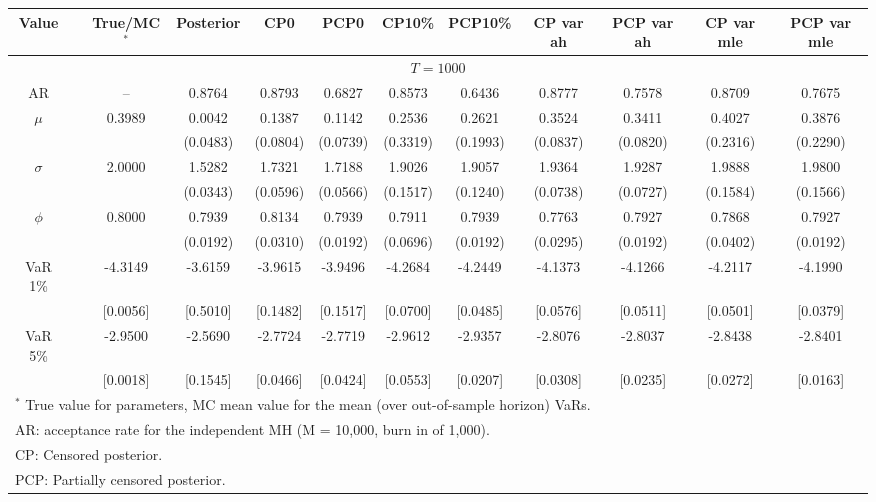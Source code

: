 { \renewcommand{\arraystretch}{1.2} 
\begin{sidewaystable} 
\center 
\begin{tabular}{cc cc cccc cccc} 
Value & & True/MC$^*$ & Posterior & CP0  & PCP0 & CP10\%  & PCP10\% &CP var ah & PCP var ah & CP var mle & PCP var mle \\ \hline 
\hline 
\multicolumn{12}{c}{$T =1000$}  \\ 
\hline 
AR && -- & 0.8764 & 0.8793 & 0.6827 & 0.8573 & 0.6436 &0.8777 & 0.7578 & 0.8709 & 0.7675  \\  
$\mu$&& 0.3989 & 0.0042 & 0.1387 & 0.1142 & 0.2536 & 0.2621 & 0.3524 & 0.3411 & 0.4027 & 0.3876  \\ 
&&   & (0.0483) & (0.0804) & (0.0739) & (0.3319) & (0.1993) &(0.0837) & (0.0820) & (0.2316) & (0.2290)  \\ 
$\sigma$&& 2.0000 & 1.5282 & 1.7321 & 1.7188 & 1.9026 & 1.9057 & 1.9364 & 1.9287 & 1.9888 & 1.9800  \\ 
&&   & (0.0343) & (0.0596) & (0.0566) & (0.1517) & (0.1240) &(0.0738) & (0.0727) & (0.1584) & (0.1566)  \\ 
$\phi$&& 0.8000 & 0.7939 & 0.8134 & 0.7939 & 0.7911 & 0.7939 & 0.7763 & 0.7927 & 0.7868 & 0.7927  \\ 
&&   & (0.0192) & (0.0310) & (0.0192) & (0.0696) & (0.0192) &(0.0295) & (0.0192) & (0.0402) & (0.0192)  \\ 
VaR 1\% && -4.3149 & -3.6159 & -3.9615 & -3.9496 & -4.2684 & -4.2449 &-4.1373 & -4.1266 & -4.2117 & -4.1990 \\ 
  && [0.0056] & [0.5010] & [0.1482] & [0.1517] & [0.0700] & [0.0485] &[0.0576] & [0.0511] & [0.0501] & [0.0379]  \\ 
VaR 5\% && -2.9500 & -2.5690 & -2.7724 & -2.7719 & -2.9612 & -2.9357 &-2.8076 & -2.8037 & -2.8438 & -2.8401 \\ 
  && [0.0018] & [0.1545] & [0.0466] & [0.0424] & [0.0553] & [0.0207] &[0.0308] & [0.0235] & [0.0272] & [0.0163]  \\ 
\hline 
\multicolumn{12}{l}{\footnotesize{$^*$ True value for parameters, MC mean value for the mean (over out-of-sample horizon) VaRs.}}  \\ 
\multicolumn{12}{l}{\footnotesize{AR: acceptance rate for the independent MH (M = 10,000, burn in of 1,000).}}  \\ 
\multicolumn{12}{l}{\footnotesize{CP: Censored posterior.}}  \\ 
\multicolumn{12}{l}{\footnotesize{PCP: Partially censored posterior.}} \\ 

\end{tabular}
\end{sidewaystable}}
